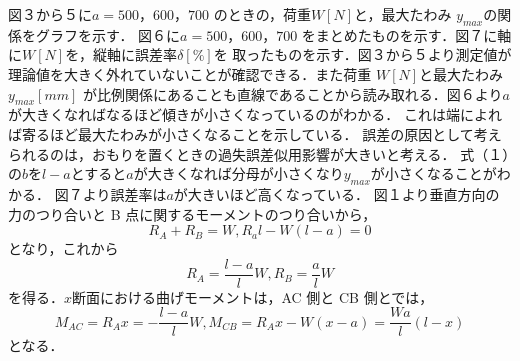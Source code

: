 \documentclass[a4paper,11pt]{jsarticle}
\begin{document}
\begin{enumerate}
\quad 図３から５に$a = 500，600，700$ のときの，荷重$ W [N] $と，最大たわみ $y_{max}$の関係をグラフを示す．
図６に$a = 500，600，700$ をまとめたものを示す．図７に軸に$ W [N]$を，縦軸に誤差率$ \delta [\%]$を
取ったものを示す．図３から５より測定値が理論値を大きく外れていないことが確認できる．また荷重 $W [N] $と最大たわみ$ y_{max}[mm]$
が比例関係にあることも直線であることから読み取れる．図６より$a$が大きくなればなるほど傾きが小さくなっているのがわかる．
これは端によれば寄るほど最大たわみが小さくなることを示している．
誤差の原因として考えられるのは，おもりを置くときの過失誤差似用影響が大きいと考える．
式（１）の$b$を$l-a$とすると$a$が大きくなれば分母が小さくなり$y_{max}$が小さくなることがわかる．
図７より誤差率は$a$が大きいほど高くなっている．
図１より垂直方向の力のつり合いと B 点に関するモーメントのつり合いから，
\begin{equation} 
  R_A+R_B=W,R_al-W(l-a)=0
\end{equation}
となり，これから
\begin{equation} 
  R_A={\dfrac{l-a}{l}W},R_B={\dfrac{a}{l}W}
\end{equation}
を得る．$x$断面における曲げモーメントは，AC 側と CB 側とでは，
\begin{equation} 
  M_{AC}=R_Ax={-\dfrac{l-a}{l}W},M_{CB}=R_Ax-W(x-a)={\dfrac{Wa}{l}(l-x)}
\end{equation}
となる．


\end{enumerate}
\end{document}
